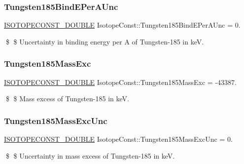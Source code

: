 \subsubsection{\texorpdfstring{Tungsten185\+Bind\+E\+Per\+A\+Unc}{Tungsten185BindEPerAUnc}}
{\footnotesize\ttfamily \mbox{\hyperlink{group___isotope_const-_macros_ga8f45a7272ce02c0b4c65c44636ed719a}{I\+S\+O\+T\+O\+P\+E\+C\+O\+N\+S\+T\+\_\+\+D\+O\+U\+B\+LE}} Isotope\+Const\+::\+Tungsten185\+Bind\+E\+Per\+A\+Unc = 0.}

\$ \$ Uncertainty in binding energy per A of Tungsten-\/185 in keV. \mbox{\label{group___isotope_const-_tungsten-_w185_ga801a974c76a0539544216f5d601c95cc}} 
\subsubsection{\texorpdfstring{Tungsten185\+Mass\+Exc}{Tungsten185MassExc}}
{\footnotesize\ttfamily \mbox{\hyperlink{group___isotope_const-_macros_ga8f45a7272ce02c0b4c65c44636ed719a}{I\+S\+O\+T\+O\+P\+E\+C\+O\+N\+S\+T\+\_\+\+D\+O\+U\+B\+LE}} Isotope\+Const\+::\+Tungsten185\+Mass\+Exc = -\/43387.}

\$ \$ Mass excess of Tungsten-\/185 in keV. \mbox{\label{group___isotope_const-_tungsten-_w185_ga4f4c78f90391700939b9fd679bfc6f6e}} 
\subsubsection{\texorpdfstring{Tungsten185\+Mass\+Exc\+Unc}{Tungsten185MassExcUnc}}
{\footnotesize\ttfamily \mbox{\hyperlink{group___isotope_const-_macros_ga8f45a7272ce02c0b4c65c44636ed719a}{I\+S\+O\+T\+O\+P\+E\+C\+O\+N\+S\+T\+\_\+\+D\+O\+U\+B\+LE}} Isotope\+Const\+::\+Tungsten185\+Mass\+Exc\+Unc = 0.}

\$ \$ Uncertainty in mass excess of Tungsten-\/185 in keV. \mbox{\label{group___isotope_const-_tungsten-_w185_gaecad0add48de662b859c3f3b74cb4bd0}} 
